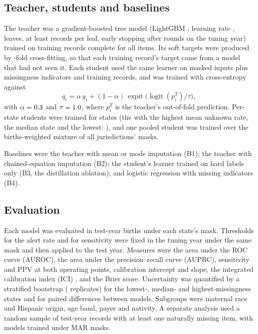 \documentclass[11pt]{article}
\begin{document}
\subsection{Teacher, students and baselines}

The teacher was a gradient-boosted tree model (LightGBM \citep{ke2017}; learning rate \LGBMlr, \LGBMleaves{} leaves, at least \LGBMminleaf{} records per leaf, early stopping after \LGBMstop{} rounds on the tuning year) trained on \NTeacher{} training records complete for all items. Its soft targets were produced by \Kfold-fold cross-fitting, so that each training record's target came from a model that had not seen it. Each student used the same learner on masked inputs plus missingness indicators and \NStudentTrain{} training records, and was trained with cross-entropy against
\begin{equation}
q_i = \alpha\, y_i + (1-\alpha)\, \operatorname{expit}\!\big(\operatorname{logit}(p^{T}_i)/\tau\big),
\end{equation}
with $\alpha=0.3$ and $\tau=1.0$, where $p^T_i$ is the teacher's out-of-fold prediction. Per-state students were trained for \NStateStudents{} states (the \NTopStates{} with the highest mean unknown rate, the median state and the lowest: \StudentStates), and one pooled student was trained over the births-weighted mixture of all \NStates{} jurisdictions' masks.

Baselines were the teacher with mean or mode imputation (B1); the teacher with chained-equation imputation \citep{pedregosa2011} (B2); the student's learner trained on hard labels only (B3, the distillation ablation); and logistic regression with missing indicators (B4).

\subsection{Evaluation}

Each model was evaluated in \EvalN{} test-year births under each state's mask. Thresholds for the \AlertPct{} alert rate and for \SensTarget{} sensitivity were fixed in the tuning year under the same mask and then applied to the test year. Measures were the area under the ROC curve (AUROC), the area under the precision--recall curve (AUPRC), sensitivity and PPV at both operating points, calibration intercept and slope, the integrated calibration index (ICI) \citep{austin2019}, and the Brier score. Uncertainty was quantified by a stratified bootstrap (\BootB{} replicates) for the lowest-, median- and highest-missingness states and for paired differences between models. Subgroups were maternal race and Hispanic origin, age band, payer and nativity. A separate analysis used a random sample of \NaturalN{} test-year records with at least one naturally missing item, with models trained under MAR masks.
\end{document}
